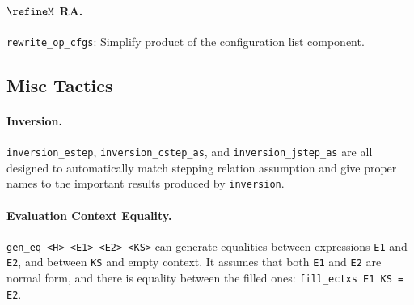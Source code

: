 \paragraph{$\refineM$ RA.}

\texttt{rewrite\_op\_cfgs}: Simplify product of the configuration list component.

\subsection{Misc Tactics}

\paragraph{Inversion. } \texttt{inversion\_estep}, \texttt{inversion\_cstep\_as}, and \texttt{inversion\_jstep\_as}
are all designed to automatically match stepping relation assumption and give proper names to the important results
produced by \texttt{inversion}.

\paragraph{Evaluation Context Equality. } \texttt{gen\_eq <H> <E1> <E2> <KS>} can generate equalities
between expressions \texttt{E1} and \texttt{E2}, and between \texttt{KS} and empty context.
It assumes that both \texttt{E1} and \texttt{E2} are normal form, and there is equality between
the filled ones: \texttt{fill\_ectxs E1 KS = E2}.
